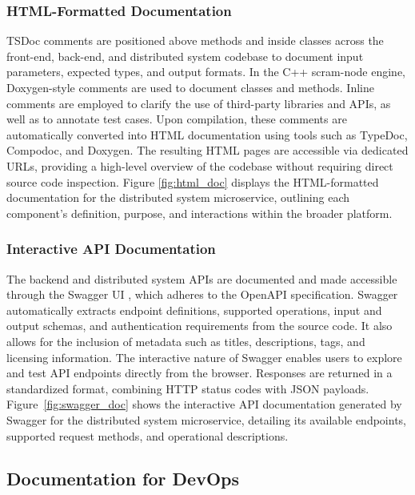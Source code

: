 \subsubsection{HTML-Formatted Documentation}

TSDoc comments are positioned above methods and inside classes across the front-end, back-end, and distributed system codebase to document input parameters, expected types, and output formats. In the C++ scram-node engine, Doxygen-style comments are used to document classes and methods. Inline comments are employed to clarify the use of third-party libraries and APIs, as well as to annotate test cases. Upon compilation, these comments are automatically converted into HTML documentation using tools such as TypeDoc, Compodoc, and Doxygen. The resulting HTML pages are accessible via dedicated URLs, providing a high-level overview of the codebase without requiring direct source code inspection. Figure \ref{fig:html_doc} displays the HTML-formatted documentation for the distributed system microservice, outlining each component’s definition, purpose, and interactions within the broader platform.

\subsubsection{Interactive API Documentation}

The backend and distributed system APIs are documented and made accessible through the Swagger UI \cite{What}, which adheres to the OpenAPI specification. Swagger automatically extracts endpoint definitions, supported operations, input and output schemas, and authentication requirements from the source code. It also allows for the inclusion of metadata such as titles, descriptions, tags, and licensing information. The interactive nature of Swagger enables users to explore and test API endpoints directly from the browser. Responses are returned in a standardized format, combining HTTP status codes with JSON payloads. Figure~\ref{fig:swagger_doc} shows the interactive API documentation generated by Swagger for the distributed system microservice, detailing its available endpoints, supported request methods, and operational descriptions.

\subsection{Documentation for DevOps}

